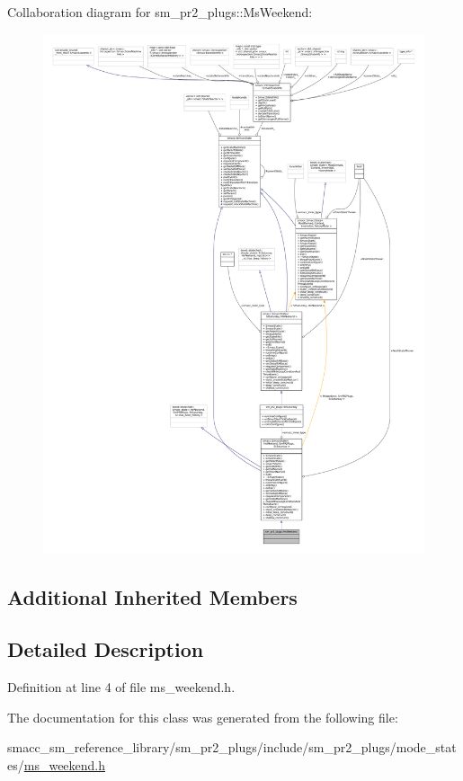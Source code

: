 Collaboration diagram for sm\+\_\+pr2\+\_\+plugs\+:\+:Ms\+Weekend\+:
\nopagebreak
\begin{figure}[H]
\begin{center}
\leavevmode
\includegraphics[width=350pt]{classsm__pr2__plugs_1_1MsWeekend__coll__graph}
\end{center}
\end{figure}
\subsection*{Additional Inherited Members}


\subsection{Detailed Description}


Definition at line 4 of file ms\+\_\+weekend.\+h.



The documentation for this class was generated from the following file\+:\begin{DoxyCompactItemize}
\item 
smacc\+\_\+sm\+\_\+reference\+\_\+library/sm\+\_\+pr2\+\_\+plugs/include/sm\+\_\+pr2\+\_\+plugs/mode\+\_\+states/\hyperlink{sm__pr2__plugs_2include_2sm__pr2__plugs_2mode__states_2ms__weekend_8h}{ms\+\_\+weekend.\+h}\end{DoxyCompactItemize}
